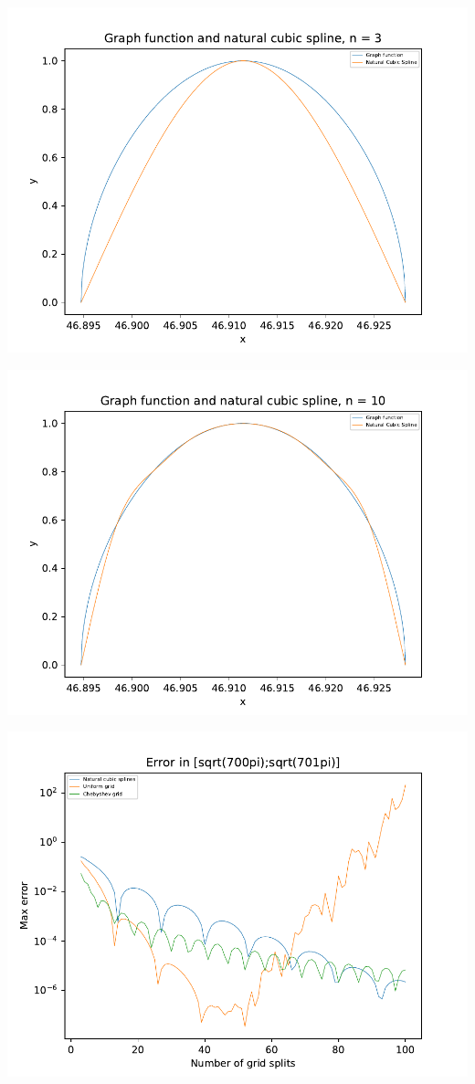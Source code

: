 \includegraphics[scale=0.75]{5.pdf}

\includegraphics[scale=0.75]{6.pdf}

\includegraphics[scale=0.75]{12.pdf}

